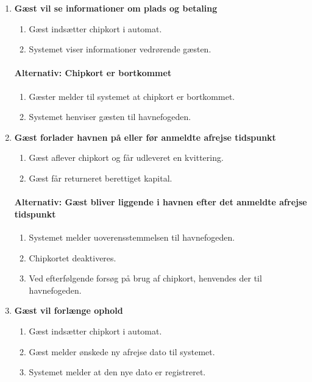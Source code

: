 \begin{enumerate}
\begin{enumerate}
      \end{enumerate}

    \item{\bf{Gæst vil se informationer om plads og betaling}}
      \begin{enumerate}
        \item Gæst indsætter chipkort i automat.
        \item Systemet viser informationer vedrørende gæsten.
      \end{enumerate}

    \paragraph{Alternativ: Chipkort er bortkommet}
      \begin{enumerate}
        \item Gæster melder til systemet at chipkort er bortkommet.
        \item Systemet henviser gæsten til havnefogeden.
      \end{enumerate}


    \item{\bf{Gæst forlader havnen på eller før anmeldte afrejse tidspunkt}}
      \begin{enumerate}
        \item Gæst aflever chipkort og får udleveret en kvittering.
        \item Gæst får returneret berettiget kapital.
      \end{enumerate}

    \paragraph{Alternativ: Gæst bliver liggende i havnen efter det anmeldte afrejse tidspunkt}
      \begin{enumerate}
        \item Systemet melder uoverensstemmelsen til havnefogeden.
        \item Chipkortet deaktiveres.
        \item Ved efterfølgende forsøg på brug af chipkort, henvendes der til havnefogeden.
      \end{enumerate}


    \item{\bf{Gæst vil forlænge ophold}}
      \begin{enumerate}
        \item Gæst indsætter chipkort i automat.
        \item Gæst melder ønskede ny afrejse dato til systemet.
        \item Systemet melder at den nye dato er registreret.
      \end{enumerate}


\end{enumerate}
